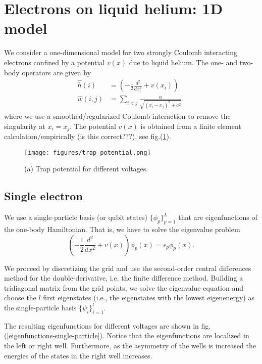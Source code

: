 \documentclass[superscriptaddress,unsortedaddress,
 amsmath,amssymb,
 aps,
]{revtex4-2}
\begin{document}
\section{Electrons on liquid helium: 1D model}

We consider a one-dimensional model for two strongly Coulomb interacting electrons confined by a potential $v(x)$ due to liquid helium. The one- and two-body operators are given by
\begin{align*}
    \hat{h}(i) &= \left(-\frac{1}{2}\frac{d^2}{dx_i^2} + v(x_i) \right) \\
    \hat{w}(i,j) &= \sum_{i < j} \frac{\alpha}{\sqrt{(x_i-x_j)^2+a^2}},
\end{align*}
where we use a smoothed/regularized Coulomb interaction to remove the singularity at $x_i = x_j$. The potential $v(x)$ is obtained from a finite element calculation/empirically (is this correct???), see fig.(\ref{fig3}).

\begin{figure}
\texttt{[image: figures/trap\_potential.png]}
\caption{ (a) Trap potential for different voltages.}
\label{fig3}
\end{figure}

\subsection{Single electron}

We use a single-particle basis (or qubit states) $\{ \phi_p \}_{p=1}^L$ that are eigenfunctions of the one-body Hamiltonian. That is, we have to solve the eigenvalue problem
\begin{equation}
   \left(-\frac{1}{2}\frac{d^2}{dx^2} + v(x)\right) \phi_p(x) = \epsilon_p \phi_p(x).
\end{equation}

We proceed by discretizing the grid and use the second-order central differences
method for the double-derivative, i.e. the finite difference method.
Building a tridiagonal matrix from the grid points, we solve the eigenvalue
equation and choose the $l$ first eigenstates (i.e., the eigenstates with the
lowest eigenenergy) as the single-particle basis $\{\psi_i\}_{i = 1}^l$.

The resulting eigenfunctions for different voltages are shown in fig.(\ref{eigenfunctions-single-particle}). Notice that the eigenfunctions are localized in the left or right well. Furthermore, as the asymmetry of the wells is increased the energies of the states in the right well increases.
\end{document}
